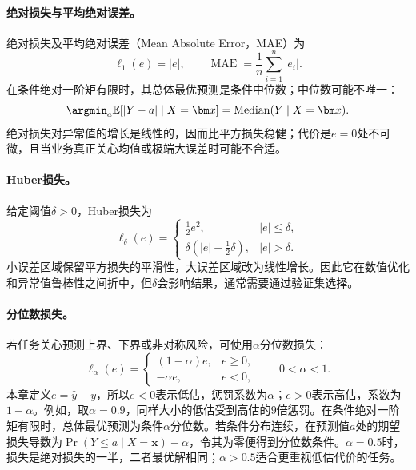 \paragraph{绝对损失与平均绝对误差。}
绝对损失及平均绝对误差（Mean Absolute Error，MAE）为
\begin{equation}
 \ell_1(e)=|e|,\qquad
 \operatorname{MAE}=\frac1n\sum_{i=1}^n|e_i|.
 \label{eq:regression-mae}
\end{equation}
在条件绝对一阶矩有限时，其总体最优预测是条件中位数；中位数可能不唯一：
\begin{equation}
 \argmin_a\mathbb E[|Y-a|\mid X=\bm x]=\operatorname{Median}(Y\mid X=\bm x).
 \label{eq:regression-conditional-median}
\end{equation}
绝对损失对异常值的增长是线性的，因而比平方损失稳健；代价是$e=0$处不可微，且当业务真正关心均值或极端大误差时可能不合适。

\paragraph{Huber损失。}
给定阈值$\delta>0$，Huber损失为
\begin{equation}
 \ell_\delta(e)=
 \begin{cases}
 \frac12e^2,&|e|\leq\delta,\\
 \delta(|e|-\frac12\delta),&|e|>\delta.
 \end{cases}
 \label{eq:regression-huber}
\end{equation}
小误差区域保留平方损失的平滑性，大误差区域改为线性增长。因此它在数值优化和异常值鲁棒性之间折中，但$\delta$会影响结果，通常需要通过验证集选择。

\paragraph{分位数损失。}
若任务关心预测上界、下界或非对称风险，可使用$\alpha$分位数损失：
\begin{equation}
 \ell_\alpha(e)=
 \begin{cases}
 (1-\alpha)e,&e\geq0,\\
 -\alpha e,&e<0,
 \end{cases}
 \qquad 0<\alpha<1.
 \label{eq:regression-quantile}
\end{equation}
本章定义$e=\hat y-y$，所以$e<0$表示低估，惩罚系数为$\alpha$；$e>0$表示高估，系数为$1-\alpha$。例如，取$\alpha=0.9$，同样大小的低估受到高估的$9$倍惩罚。在条件绝对一阶矩有限时，总体最优预测为条件$\alpha$分位数。若条件分布连续，在预测值$a$处的期望损失导数为$\Pr(Y\leq a\mid X=\bm x)-\alpha$，令其为零便得到分位数条件。$\alpha=0.5$时，损失是绝对损失的一半，二者最优解相同；$\alpha>0.5$适合更重视低估代价的任务。

